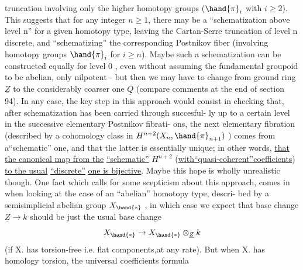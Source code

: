 
truncation involving only the higher homotopy groups ($\hand{\pi}_i$ with $i\geqslant 2$).
This suggests that for any integer $n\geqslant 1$, there may be a ``schematization
above level n'' for a given homotopy type, leaving the Cartan-Serre
truncation of  level n discrete, and ``schematizing'' the
corresponding  Postnikov fiber (involving homotopy groups $\hand{\pi}_i$ for $i\geqslant n$).
Maybe such a schematization can be constructed equally for level 0 ,
even without assuming the fundamental groupoid to be abelian, 
only nilpotent - but then we may have to change from ground ring $\underline{Z}$ to
the considerably coarser one $\underline{Q}$ (compare comments at the end of section
94). In any case, the key step in this approach would consist in 
checking that, after schematization has been carried through succesful-%
ly up to a certain level in the successive elementary Postnikov fibrati-%
ons, the next elementary fibration (described by a cohomology class in
$H^{n+2}(X_n,\hand{\pi}_{n+1})$ ) comes from a``schematic'' one, and that the latter is
essentially unique; in other words, \uline{that the canonical map from the}
\uline{``schematic''} $H^{n+2}$ (\uline{with``quasi-coherent''coefficients}) \uline{to the usual}
\uline{``discrete''} \uline{one is bijective}. Maybe this hope is wholly unrealistic\hand{\unsure{,}}
though. One fact which calls for some scepticism about this approach,
comes in when looking at the case of an ``abelian'' homotopy type, descri-%
bed by a semisimplicial abelian group $X_{\hand{\ast}}$ , in which case we expect that
base change $\underline{Z}\rightarrow k$ should be just the usual base change
\[ X_{\hand{\ast}} \rightarrow X_{\hand{\ast}}\otimes_{\underline{Z}} k \]
(if X. has torsion-free  i.e. flat components,at any rate).
But when X. has homology torsion, the universal coefficients formula
